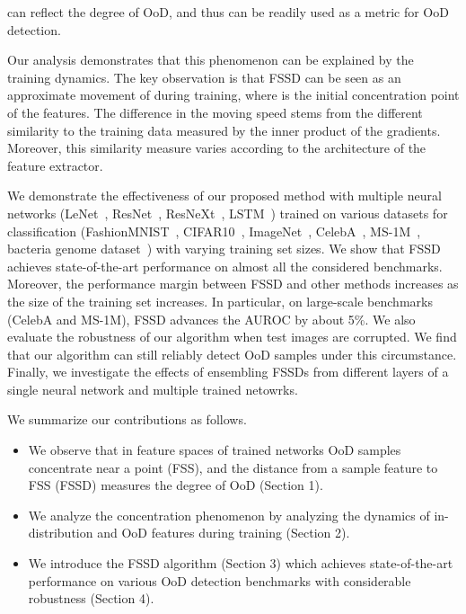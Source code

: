 \documentclass[letterpaper]{article}
\begin{document}
can reflect the degree of OoD, and thus can be readily used as a metric for OoD detection.

Our analysis demonstrates that this phenomenon can be explained by the training dynamics. The key observation is that FSSD can be seen as an approximate movement of  during training, where  is the initial concentration point of the features. The difference in the moving speed  stems from the different similarity to the training data measured by the inner product of the gradients. Moreover, this similarity measure varies according to the architecture of the feature extractor. 


We demonstrate the effectiveness of our proposed method with multiple neural networks (LeNet~\cite{mnist}, ResNet~\cite{resnet}, ResNeXt~\cite{resnext}, LSTM~\cite{lstm}) trained on various datasets for classification (FashionMNIST~\cite{fmnist}, CIFAR10~\cite{cifar10}, ImageNet~\cite{imagenet}, CelebA~\cite{celeba}, MS-1M~\cite{ms1m}, bacteria genome dataset~\cite{ren2019likelihood}) with varying training set sizes.
We show that FSSD achieves state-of-the-art performance on almost all the considered benchmarks.
Moreover, the performance margin between FSSD and other methods increases as the size of the training set increases.
In particular, on large-scale benchmarks (CelebA and MS-1M), FSSD advances the AUROC by about 5\%.
We also evaluate the robustness of our algorithm when test images are corrupted.
We find that our algorithm can still reliably detect OoD samples under this circumstance.
Finally, we investigate the effects of ensembling FSSDs from different layers of a single neural network and multiple trained netowrks.


We summarize our contributions as follows.
\begin{itemize}
\item We observe that in feature spaces of trained networks OoD samples concentrate near a point (FSS), and the distance from a sample feature to FSS (FSSD) measures the degree of OoD (Section 1).
\item We analyze the concentration phenomenon by analyzing the dynamics of in-distribution and OoD features during training (Section 2).
\item We introduce the FSSD algorithm (Section 3) which achieves state-of-the-art performance on various OoD detection benchmarks with considerable robustness (Section 4).
\end{itemize}
\end{document}
